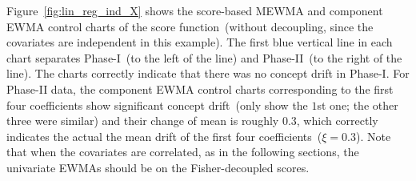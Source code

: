 \documentclass[twoside,11pt]{article}
\begin{document}
\begin{appendices}
Figure~\ref{fig:lin_reg_ind_X} shows the score-based MEWMA and component EWMA control charts of the score function~(without decoupling, since the covariates are independent in this example). The first blue vertical line in each chart separates Phase-I~(to the left of the line) and Phase-II~(to the right of the line). The charts correctly indicate that there was no concept drift in Phase-I. For Phase-II data, the component EWMA control charts corresponding to the first four coefficients show significant concept drift~(only show the $1$st one; the other three were similar) and their change of mean is roughly $0.3$, which correctly indicates the actual the mean drift of the first four coefficients~($\xi=0.3$). Note that when the covariates are correlated, as in the following sections, the univariate EWMAs should be on the Fisher-decoupled scores. 



\end{appendices}
\end{document}
